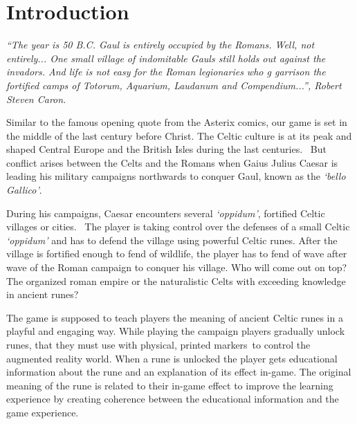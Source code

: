 \section{Introduction}
\label{sec:introduction}

\textit{``The year is 50 B.C. Gaul is entirely occupied by the Romans. Well, not entirely... One small village of indomitable Gauls still holds out against the invadors. And life is not easy for the Roman legionaries who g garrison the fortified camps of Totorum, Aquarium, Laudanum and Compendium...'', Robert Steven Caron.}~\cite{asterix-beginning}

Similar to the famous opening quote from the Asterix comics, our game is set in the middle of the last century before Christ. The Celtic culture is at its peak and shaped Central Europe and the British Isles during the last centuries.~\cite{celtic-expansion} But conflict arises between the Celts and the Romans when Gaius Julius Caesar is leading his military campaigns northwards to conquer Gaul, known as the \textit{`bello Gallico'}.\footnotemark
{}

During his campaigns, Caesar encounters several \textit{`oppidum'}, fortified Celtic villages or cities.~\cite{collis-oppidum} The player is taking control over the defenses of a small Celtic \textit{`oppidum'} and has to defend the village using powerful Celtic runes. After the village is fortified enough to fend of wildlife, the player has to fend of wave after wave of the Roman campaign to conquer his village. Who will come out on top? The organized roman empire or the naturalistic Celts with exceeding knowledge in ancient runes?

The game is supposed to teach players the meaning of ancient Celtic runes in a playful and engaging way. While playing the campaign players gradually unlock runes, that they must use with physical, printed markers\footnotemark \ to control the augmented reality world.
When a rune is unlocked the player gets educational information about the rune and an explanation of its effect in-game. The original meaning of the rune is related to their in-game effect to improve the learning experience by creating coherence between the educational information and the game experience.

